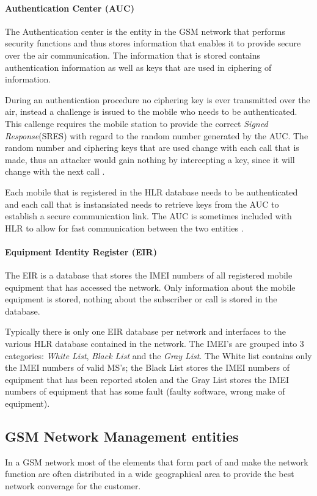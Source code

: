 \paragraph{Authentication Center (AUC)}
The Authentication center is the entity in the GSM network that performs security functions and thus stores information that enables it to provide secure over the air communication. The information that is stored contains authentication information as well as keys that are used in ciphering of information.

During an authentication procedure no ciphering key is ever transmitted over the air, instead a challenge is issued to the mobile who needs to be authenticated. This callenge requires the mobile station to provide the correct \emph{Signed Response}(SRES) with regard to the random number generated by the AUC. The random number and ciphering keys that are used change with each call that is made, thus an attacker would gain nothing by intercepting a key, since it will change with the next call \cite{GSMSysEngin}.

Each mobile that is registered in the HLR database needs to be authenticated and each call that is instansiated needs to retrieve keys from the AUC to establish a secure communication link. The AUC is sometimes included with HLR to allow for fast communication between the two entities \cite{GSMSysEngin}.

\paragraph{Equipment Identity Register (EIR)}
The EIR is a database that stores the IMEI numbers of all registered mobile equipment that has accessed the network. Only information about the mobile equipment is stored, nothing about the subscriber or call is stored in the database.

Typically there is only one EIR database per network and interfaces to the various HLR database contained in the network. The IMEI's are grouped into 3 categories: \emph{White List}, \emph{Black List} and the \emph{Gray List}. The White list contains only the IMEI numbers of valid MS's; the Black List stores the IMEI numbers of equipment that has been reported stolen and the Gray List stores the IMEI numbers of equipment that has some fault (faulty software, wrong make of equipment).

\subsection{GSM Network Management entities}
In a GSM network most of the elements that form part of and make the network function are often distributed in a wide geographical area to provide the best network converage for the customer. 

